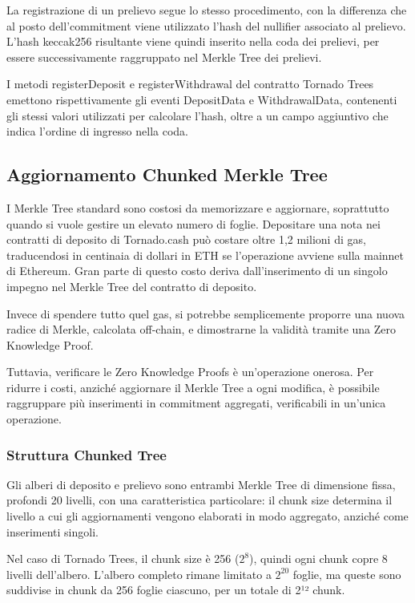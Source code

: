 La registrazione di un prelievo segue lo stesso procedimento, con la differenza che al posto dell’commitment viene utilizzato l’hash del nullifier associato al prelievo. L'hash keccak256 risultante viene quindi inserito nella coda dei prelievi, per essere successivamente raggruppato nel Merkle Tree dei prelievi.  

I metodi registerDeposit e registerWithdrawal del contratto Tornado Trees emettono rispettivamente gli eventi DepositData e WithdrawalData, contenenti gli stessi valori utilizzati per calcolare l’hash, oltre a un campo aggiuntivo che indica l’ordine di ingresso nella coda.

\subsection{Aggiornamento Chunked Merkle Tree}

I Merkle Tree standard sono costosi da memorizzare e aggiornare, soprattutto quando si vuole gestire un elevato numero di foglie. Depositare una nota nei contratti di deposito di Tornado.cash può costare oltre 1,2 milioni di gas, traducendosi in centinaia di dollari in ETH se l'operazione avviene sulla mainnet di Ethereum. Gran parte di questo costo deriva dall'inserimento di un singolo impegno nel Merkle Tree del contratto di deposito.  

Invece di spendere tutto quel gas, si potrebbe semplicemente proporre una nuova radice di Merkle, calcolata off-chain, e dimostrarne la validità tramite una Zero Knowledge Proof.  

Tuttavia, verificare le Zero Knowledge Proofs è un'operazione onerosa. Per ridurre i costi, anziché aggiornare il Merkle Tree a ogni modifica, è possibile raggruppare più inserimenti in commitment aggregati, verificabili in un'unica operazione.

\subsubsection{Struttura Chunked Tree}

Gli alberi di deposito e prelievo sono entrambi Merkle Tree di dimensione fissa, profondi 20 livelli, con una caratteristica particolare: il chunk size determina il livello a cui gli aggiornamenti vengono elaborati in modo aggregato, anziché come inserimenti singoli.  

Nel caso di Tornado Trees, il chunk size è 256 ($2^8$), quindi ogni chunk copre 8 livelli dell'albero. L'albero completo rimane limitato a $2^{20}$ foglie, ma queste sono suddivise in chunk da 256 foglie ciascuno, per un totale di 2¹² chunk.  

